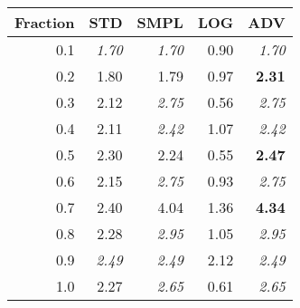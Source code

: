 \documentclass{standalone}
\begin{document}
\begin{tabular}{r|rrrr}
      \toprule
      Fraction & STD & SMPL & LOG & ADV\\
      \midrule
      0.1 & \emph{1.70} & \emph{1.70} & 0.90 & \emph{1.70}\\
  0.2 & 1.80 & 1.79 & 0.97 & \textbf{2.31}\\
  0.3 & 2.12 & \emph{2.75} & 0.56 & \emph{2.75}\\
  0.4 & 2.11 & \emph{2.42} & 1.07 & \emph{2.42}\\
  0.5 & 2.30 & 2.24 & 0.55 & \textbf{2.47}\\
  0.6 & 2.15 & \emph{2.75} & 0.93 & \emph{2.75}\\
  0.7 & 2.40 & 4.04 & 1.36 & \textbf{4.34}\\
  0.8 & 2.28 & \emph{2.95} & 1.05 & \emph{2.95}\\
  0.9 & \emph{2.49} & \emph{2.49} & 2.12 & \emph{2.49}\\
  1.0 & 2.27 & \emph{2.65} & 0.61 & \emph{2.65}\\
  \bottomrule
\end{tabular}
\end{document}
